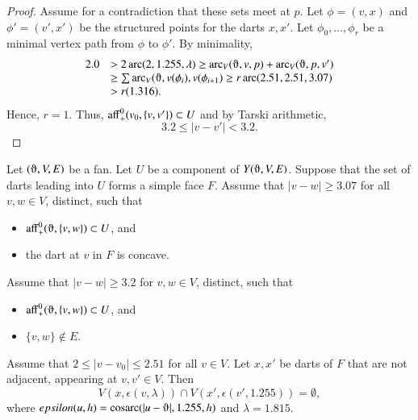\begin{proof}
Assume for a contradiction that these sets meet at $p$.
Let $\phi=(v,x)$ and $\phi'=(v',x')$ be the structured points for
the darts $x,x'$.  Let $\phi_0,\ldots,\phi_r$ be a minimal vertex
path from $\phi$ to $\phi'$.  By minimality,
$$
\begin{array}{lll}
 2.0 &> 2\arc(2,1.255,\lambda) \ge \arc_V(\orgn,v,p) +
\arc_V(\orgn,p,v') \\
  &\ge \sum \arc_V(\orgn,v(\phi_i),v(\phi_{i+1})\ge
  r \arc(2.51,2.51,3.07)\\ 
  &> r (1.316).
\end{array}
$$
Hence, $r=1$.
Thus, ${\operatorname{aff}}_+^0(v_0,\{v,v'\})\subset U$ and by Tarski arithmetic,
$$
  3.2 \le |v-v'| < 3.2.
$$
\end{proof}


 
\begin{lemma}
Let $(\orgn,V,E)$ be a fan.  Let $U$ be a component of $Y(\orgn,V,E)$.
Suppose that the set of darts leading into $U$ forms a simple face $F$.
Assume that $|v-w|\ge 3.07$ for all $v,w\in V$, distinct, such that
  \begin{itemize}
   \item $\op{aff}_+^0(\orgn,\{v,w\})\subset U$, and
   \item the dart at $v$ in $F$ is concave.
  \end{itemize}
Assume that $|v-w|\ge 3.2$ for $v,w\in V$, distinct, such that
  \begin{itemize}
   \item $\op{aff}_+^0(\orgn,\{v,w\})\subset U$, and
   \item $\{v,w\}\not\in E$.  %
  \end{itemize}
Assume that $2\le |v-v_0|\le 2.51$ for all $v\in V$.
Let $x,x'$ be darts of $F$ that are not adjacent, appearing at $v,v'\in V$.  
Then
$$
V(x,\epsilon(v,\lambda))\cap V(x',\epsilon(v',1.255)) = \emptyset,
$$
where $\epsilon(u,h) = \cosarc(|u-\orgn|,1.255,h)$ and $\lambda=1.815$.
\end{lemma}


